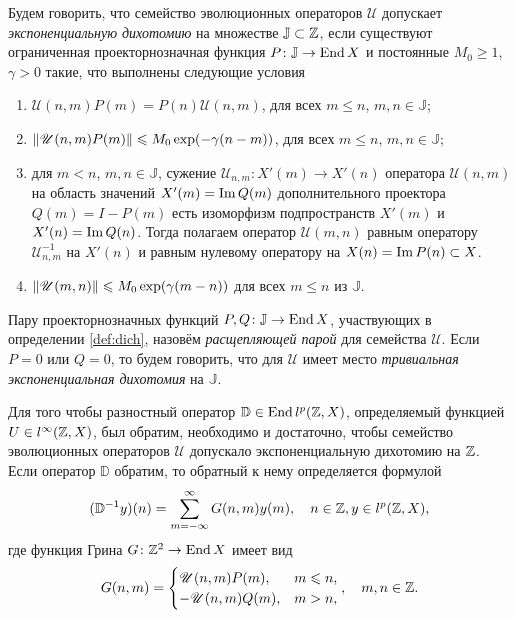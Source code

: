\begin{definition}\label{def:dich}
    Будем говорить, что семейство эволюционных операторов $\mathcal U$ допускает \emph{экспоненциальную дихотомию} на множестве $\mathbb J \subset \mathbb{Z}$, если существуют ограниченная проекторнозначная функция $P \colon \mathbb J \to \operatorname{End} X$ и постоянные $M_0 \geq 1$, $\gamma > 0$ такие, что выполнены следующие условия
    \begin{enumerate}
        \item $\mathcal U(n, m) P(m) = P(n) \mathcal U(n, m)$, для всех $m \leq n$, $m, n \in \mathbb J$;
        \item $\left\|\mathcal U(n, m) P(m)\right\| \leqslant M_0 \exp(-\gamma (n - m))$, для всех $m \leq n$, $m, n \in \mathbb J$;
        \item для $m < n$, $m, n \in \mathbb J$, сужение $\mathcal U_{n, m}: X'(m) \to X'(n)$ оператора $\mathcal U(n, m)$ на область значений $X'(m) = \operatorname{Im} Q(m)$ дополнительного проектора $Q(m) = I - P(m)$ есть изоморфизм подпространств $X'(m)$ и $X'(n) = \operatorname{Im} Q(n)$.
        Тогда полагаем оператор $\mathcal U(m, n)$ равным оператору $\mathcal U_{n, m}^{-1}$ на $X'(n)$ и равным нулевому оператору на $X(n) = \operatorname{Im} P(n) \subset X$.
        \item $\left\|\mathcal U(m, n)\right\| \leqslant M_0 \exp(\gamma (m - n))$ для всех $m \leq n$ из $\mathbb J$.
    \end{enumerate}
\end{definition}
Пару проекторнозначных функций $P, Q\colon \mathbb J \to \operatorname{End} X$, участвующих в определении \ref{def:dich}, назовём \emph{расщепляющей парой} для семейства $\mathcal U$. Если $P= 0$ или $Q = 0$, то будем говорить, что для $\mathcal U$ имеет место \emph{тривиальная экспоненциальная дихотомия} на $\mathbb J$.

\begin{theorem}\label{th:dich}
    Для того чтобы разностный оператор $\mathbb D \in \operatorname{End} l^p(\mathbb{Z}, X)$, определяемый функцией $U \in l^\infty(\mathbb{Z}, X)$, был обратим, необходимо и достаточно, чтобы семейство эволюционных операторов $\mathcal U$ допускало экспоненциальную дихотомию на $\mathbb{Z}$. Если оператор $\mathbb D$ обратим, то обратный к нему определяется формулой
    \[ (\mathbb D^{-1} y)(n) = \sum_{m=-\infty}^\infty G(n, m) y(m), \quad n \in \mathbb{Z}, y \in l^p(\mathbb{Z}, X),\]
    где функция Грина $G\colon \mathbb{Z}^2 \to \operatorname{End} X$ имеет вид
    \[ G(n, m) = \begin{cases}
        \mathcal U(n, m) P(m), & m \leqslant n, \\
        -\mathcal U(n, m) Q(m),& m > n,
    \end{cases}, \quad m, n \in \mathbb{Z}. \]
\end{theorem}

